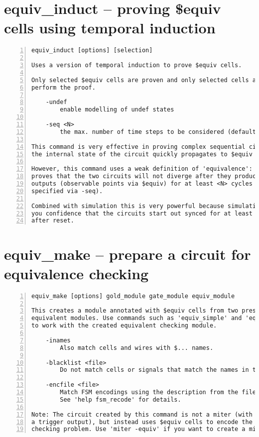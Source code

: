 \section{equiv\_induct -- proving \$equiv cells using temporal induction}
\label{cmd:equiv_induct}
\begin{lstlisting}[numbers=left,frame=single]
    equiv_induct [options] [selection]

Uses a version of temporal induction to prove $equiv cells.

Only selected $equiv cells are proven and only selected cells are used to
perform the proof.

    -undef
        enable modelling of undef states

    -seq <N>
        the max. number of time steps to be considered (default = 4)

This command is very effective in proving complex sequential circuits, when
the internal state of the circuit quickly propagates to $equiv cells.

However, this command uses a weak definition of 'equivalence': This command
proves that the two circuits will not diverge after they produce equal
outputs (observable points via $equiv) for at least <N> cycles (the <N>
specified via -seq).

Combined with simulation this is very powerful because simulation can give
you confidence that the circuits start out synced for at least <N> cycles
after reset.
\end{lstlisting}

\section{equiv\_make -- prepare a circuit for equivalence checking}
\label{cmd:equiv_make}
\begin{lstlisting}[numbers=left,frame=single]
    equiv_make [options] gold_module gate_module equiv_module

This creates a module annotated with $equiv cells from two presumably
equivalent modules. Use commands such as 'equiv_simple' and 'equiv_status'
to work with the created equivalent checking module.

    -inames
        Also match cells and wires with $... names.

    -blacklist <file>
        Do not match cells or signals that match the names in the file.

    -encfile <file>
        Match FSM encodings using the description from the file.
        See 'help fsm_recode' for details.

Note: The circuit created by this command is not a miter (with something like
a trigger output), but instead uses $equiv cells to encode the equivalence
checking problem. Use 'miter -equiv' if you want to create a miter circuit.
\end{lstlisting}

